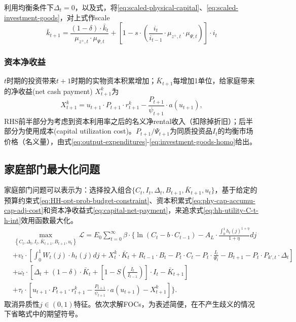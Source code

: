 利用均衡条件下$\Delta_t=0$，以及式，将\eqref{eq:scaled-physical-capital}、\eqref{eq:scaled-investment-goods}，对上式作scale
\begin{equation}
\bar{k}_{t+1} =
\frac{
  \left( 1 - \delta \right) \cdot \bar{k}_t
}{
  \mu_{z^+,t} \cdot \mu_{\Psi,t}
}
+ \left[
  1-s \cdot \left(
  \frac{i_t}{i_{t-1}} \cdot \mu_{z^+,t} \cdot \mu_{\Psi,t}
  \right)
\right] \cdot i_t
\end{equation}

\subsubsection{资本净收益}
$t$时期的投资带来$t+1$时期的实物资本积累增加；$\bar{K}_{t+1}$每增加1单位，给家庭带来的净收益(net cash payment) $X_{t+1}^k$为
\begin{equation}
  \label{eq:capital-net-payment}
  X_{t+1}^k = u_{t+1} \cdot P_{t+1} \cdot r_{t+1}^k - \frac{P_{t+1}}{\psi_{t+1}} \cdot a(u_{t+1}),
\end{equation}
RHS前半部分为考虑到资本利用率之后的名义净rental收入（扣除掉折旧）；后半部分为使用成本(capital utilization cost)。$P_{t+1}/\Psi_{t+1}$为同质投资品$I_t$的均衡市场价格（名义量），由式\eqref{eq:output-expenditures}-\eqref{eq:investment-goods-homo}给出。

\subsection{家庭部门最大化问题}
\label{sec:mHH-opti}
家庭部门问题可以表示为：选择投入组合$\{ C_t, I_t, \Delta_t, B_{t+1}, \bar{K}_{t+1}, u_t\}$，基于给定的预算约束式\eqref{eq:HH-opt-prob-budget-constraint}、资本积累式\eqref{eq:phy-cap-accumu-cap-adj-cost}和资本净收益式\eqref{eq:capital-net-payment}，来追求式\eqref{eq:hh-utility-C-t-h-int}效用函数最大化。
\begin{equation*}
\begin{split}
&\max_{\left\{C_t,\Delta_t, I_t, \bar{K}_{t+1}, B_{t+1}, u_t\right\}} \mathcal{L} = E_0 \sum_{t=0}^{\infty} \beta \cdot \{ \ln \left(C_t - b \cdot C_{t-1}\right) - A_L \cdot \frac{\int^1_{0} h_t(j)^{1+\eta}}{1+\eta} dj \\
&+v_t \cdot \left[
  \int^1_0 W_t(j) \cdot h_t(j) dj + X_t^k \cdot \bar{K}_t + R_{t-1} \cdot B_t - P_t \cdot C_t - P_t \cdot \frac{I_t}{\Psi_t} - B_{t+1} -P_t \cdot P_{k',t} \cdot \Delta_t
\right] \\
&+\omega_t \cdot \left[
  \Delta_t + \left( 1 - \delta \right) \cdot \bar{K}_t + \left[1-S\left(\frac{I_t}{I_{t-1}}\right)\right] \cdot I_t - \bar{K}_{t+1}
\right] \\
&+\tau_{t} \cdot \left[
  u_{t+1} \cdot P_{t+1} \cdot r_{t+1}^k - \frac{P_{t+1}}{\psi_{t+1}} \cdot a(u_{t+1}) - X_{t+1}^k
\right]\}.
\end{split}
\end{equation*}
取消异质性$j\in(0,1)$特征。依次求解FOCs，为表述简便，在不产生歧义的情况下省略式中的期望符号。


